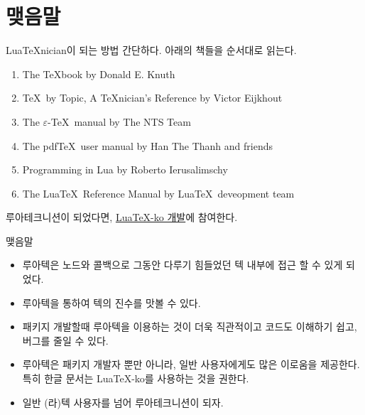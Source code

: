 \documentclass[t,10pt]{beamer}
\begin{document}
\section{맺음말}

\begin{frame}[fragile]{Lua\TeX nician이 되는 방법}
  간단하다. 아래의 책들을 순서대로 읽는다.
  \begin{enumerate}
  \item \alert{The \TeX book} by Donald E. Knuth
  \item \alert{\TeX\ by Topic, A \TeX nician's Reference} by Victor Eijkhout
  \item \alert{The $\varepsilon$-\TeX\ manual} by The NTS Team
  \item \alert{The pdf\TeX\ user manual} by Han The Thanh and friends
  \item \alert{Programming in Lua} by Roberto Ierusalimschy
  \item \alert{The Lua\TeX\ Reference Manual} by Lua\TeX\ deveopment team
  \end{enumerate}

  루아테크니션이 되었다면, \alert{\href{http://github.com/dohyun/luatexko}%
  {Lua\TeX-ko 개발}}에 참여한다.
\end{frame}

\begin{frame}{맺음말}
  \begin{itemize}
  \item 루아텍은 노드와 콜백으로 그동안 다루기 힘들었던 텍 내부에 접근 할 수
    있게 되었다.
  \item 루아텍을 통하여 텍의 진수를 맛볼  수 있다.
  \item 패키지 개발할때 루아텍을 이용하는 것이 더욱 직관적이고 코드도 이해하기
    쉽고, 버그를 줄일 수 있다.
  \item 루아텍은 패키지 개발자 뿐만 아니라, 일반 사용자에게도 많은 이로움을
    제공한다. 특히 한글 문서는 Lua\TeX-ko를 사용하는 것을 권한다.
  \item 일반 (라)텍 사용자를 넘어 루아테크니션이 되자.
  \end{itemize}
\end{frame}
\end{document}
